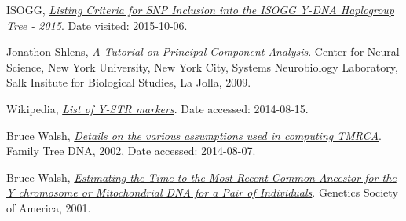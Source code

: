 \begin{thebibliography}{bla}
 ISOGG,
\emph{\href{http://www.isogg.org/tree/ISOGG_SNP_Requirements.html}
{Listing Criteria for SNP Inclusion into the ISOGG Y-DNA Haplogroup Tree - 2015}}.
Date visited: 2015-10-06.

 Jonathon Shlens,
\emph{\href{http://rieke-server.physiol.washington.edu/People/Fred/Classes/545/shlens-pca.pdf}
{A Tutorial on Principal Component Analysis}}.
Center for Neural Science, New York University,
New York City, 
Systems Neurobiology Laboratory, Salk Insitute for Biological Studies,
La Jolla, 2009.

 Wikipedia,
\emph{\href{http://en.wikipedia.org/wiki/List_of_DYS_markers}
{List of Y-STR markers}}.
Date accessed: 2014-08-15.

 Bruce Walsh,
\emph{\href{http://nitro.biosci.arizona.edu/ftDNA/models.html}
{Details on the various assumptions used in computing TMRCA}}.
Family Tree DNA, 2002, Date accessed: 2014-08-07.

 Bruce Walsh,
\emph{\href{http://www.ncbi.nlm.nih.gov/pmc/articles/PMC1461668/}
{Estimating the Time to the Most Recent Common Ancestor for the
Y chromosome or Mitochondrial DNA for a Pair of Individuals}}.
Genetics Society of America, 2001.

\end{thebibliography}
